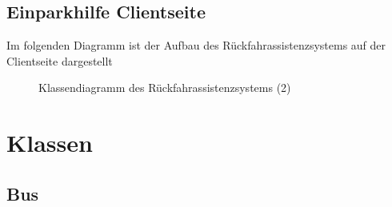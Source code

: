 \documentclass[entwurf.tex]{subfiles}
\begin{document}
  	\section{Einparkhilfe Clientseite}
		Im folgenden Diagramm ist der Aufbau des Rückfahrassistenzsystems auf der Clientseite dargestellt
		\begin{figure}[H]
  			\caption{Klassendiagramm des Rückfahrassistenzsystems (2)}
  		\end{figure}
  	
  	
\chapter{Klassen}
	\section{Bus}
\end{document}

